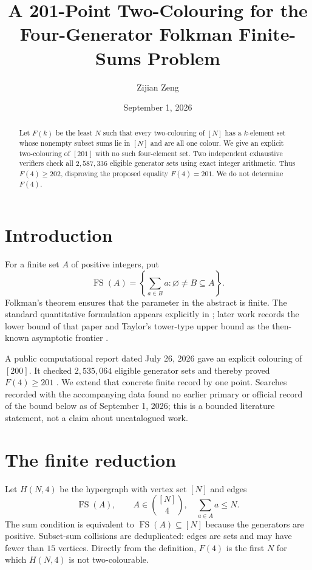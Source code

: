 \documentclass[11pt]{amsart}
\title[A 201-Point Folkman Finite-Sums Colouring]{A 201-Point Two-Colouring for the Four-Generator Folkman Finite-Sums Problem}
\author{Zijian Zeng}
\date{September 1, 2026}
\begin{document}
\begin{abstract}
Let $F(k)$ be the least $N$ such that every two-colouring of $[N]$ has a
$k$-element set whose nonempty subset sums lie in $[N]$ and are all one
colour.  We give an explicit two-colouring of $[201]$ with no such
four-element set.  Two independent exhaustive verifiers check all
$2{,}587{,}336$ eligible generator sets using exact integer arithmetic.  Thus
$F(4)\geq202$, disproving the proposed equality $F(4)=201$.  We do not
determine $F(4)$.
\end{abstract}
\maketitle

\section{Introduction}
For a finite set $A$ of positive integers, put
\[
 \operatorname{FS}(A)=\left\{\sum_{a\in B}a:\varnothing\ne B\subseteq A\right\}.
\]
Folkman's theorem ensures that the parameter in the abstract is finite.  The
standard quantitative formulation appears explicitly in
\cite{BaloghEtAl2017}; later work records the lower bound of that paper and
Taylor's tower-type upper bound as the then-known asymptotic frontier
\cite[p.~5]{BaloghLavrovShakanWagner2019}.

A public computational report dated July 26, 2026 gave an explicit colouring
of $[200]$. It checked $2{,}535{,}064$ eligible generator sets and thereby
proved $F(4)\geq201$ \cite{WorkingReport531}.  We extend that concrete
finite record by one point.  Searches recorded with the accompanying data
found no earlier primary or official record of the bound below as of
September 1, 2026; this is a bounded literature statement, not a claim about
uncatalogued work.

\section{The finite reduction}
Let $H(N,4)$ be the hypergraph with vertex set $[N]$ and edges
\[
 \operatorname{FS}(A),\qquad A\in\binom{[N]}4,\quad \sum_{a\in A}a\leq N.
\]
The sum condition is equivalent to $\operatorname{FS}(A)\subseteq[N]$ because
the generators are positive.  Subset-sum collisions are deduplicated: edges
are sets and may have fewer than $15$ vertices.  Directly from the definition,
$F(4)$ is the first $N$ for which $H(N,4)$ is not two-colourable.
\end{document}
